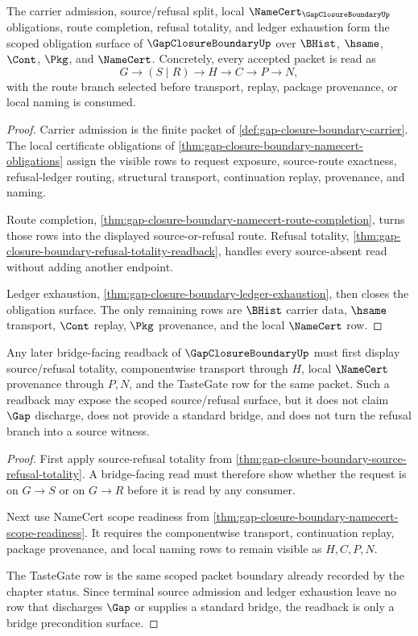 \begin{theorem}
\label{thm:gap-closure-boundary-namecert-scope-readiness}
The carrier admission, source/refusal split, local $\NameCert_{\GapClosureBoundaryUp}$ obligations, route completion, refusal totality, and ledger exhaustion form the scoped obligation surface of $\GapClosureBoundaryUp$ over $\BHist$, $\hsame$, $\Cont$, $\Pkg$, and $\NameCert$. Concretely, every accepted packet is read as
$$
G \to (S \mid R) \to H \to C \to P \to N,
$$
with the route branch selected before transport, replay, package provenance, or local naming is consumed.
\end{theorem}
\begin{proof}
Carrier admission is the finite packet of \autoref{def:gap-closure-boundary-carrier}. The local certificate obligations of \autoref{thm:gap-closure-boundary-namecert-obligations} assign the visible rows to request exposure, source-route exactness, refusal-ledger routing, structural transport, continuation replay, provenance, and naming.

Route completion, \autoref{thm:gap-closure-boundary-namecert-route-completion}, turns those rows into the displayed source-or-refusal route. Refusal totality, \autoref{thm:gap-closure-boundary-refusal-totality-readback}, handles every source-absent read without adding another endpoint.

Ledger exhaustion, \autoref{thm:gap-closure-boundary-ledger-exhaustion}, then closes the obligation surface. The only remaining rows are $\BHist$ carrier data, $\hsame$ transport, $\Cont$ replay, $\Pkg$ provenance, and the local $\NameCert$ row.
\end{proof}

\begin{theorem}
\label{thm:gap-closure-boundary-bridge-readback-scope}
Any later bridge-facing readback of $\GapClosureBoundaryUp$ must first display source/refusal totality, componentwise transport through $H$, local $\NameCert$ provenance through $P,N$, and the TasteGate row for the same packet. Such a readback may expose the scoped source/refusal surface, but it does not claim $\Gap$ discharge, does not provide a standard bridge, and does not turn the refusal branch into a source witness.
\end{theorem}
\begin{proof}
First apply source-refusal totality from \autoref{thm:gap-closure-boundary-source-refusal-totality}. A bridge-facing read must therefore show whether the request is on $G \longrightarrow S$ or on $G \longrightarrow R$ before it is read by any consumer.

Next use NameCert scope readiness from \autoref{thm:gap-closure-boundary-namecert-scope-readiness}. It requires the componentwise transport, continuation replay, package provenance, and local naming rows to remain visible as $H,C,P,N$.

The TasteGate row is the same scoped packet boundary already recorded by the chapter status. Since terminal source admission and ledger exhaustion leave no row that discharges $\Gap$ or supplies a standard bridge, the readback is only a bridge precondition surface.
\end{proof}
